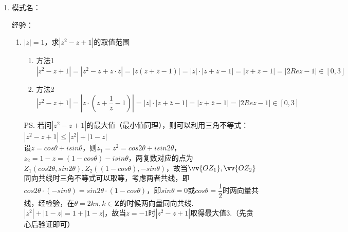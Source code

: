 \begin{enumerate}
\begin{enumerate}
\begin{jieda}
    \end{jieda}
    \end{enumerate}

    \item 模式名：
    
    经验：


    \begin{enumerate}
        \item $|z| = 1$，求$|z^2-z+1|$的取值范围
        \begin{jieda}
            \begin{enumerate}
                \item 方法1 \\
                $|z^2-z+1| = |z^2-z+z\cdot \overline{z}| = |z(z + \overline{z} - 1)| = |z| \cdot |z + \overline{z}-1| = |z + \overline{z}-1| = |2Re z - 1| \in [0, 3]$
                \item 方法2 \\
                $|z^2-z+1| = \left|z \cdot \left(z+\dfrac{1}{z} - 1\right)\right| = |z| \cdot |z + \overline{z}-1| = |z + \overline{z}-1| = |2Re z - 1| \in [0, 3]$
            \end{enumerate}
            \ps 若问$|z^2-z+1|$的最大值（最小值同理），则可以利用三角不等式：\\
            $|z^2-z+1| \leq |z^2| + |1-z|$ \\
            设$z = cos\theta + isin\theta$，则$z_1 = z^2 = cos2\theta + i sin2\theta$，$z_2 = 1-z = (1-cos\theta)-isin\theta$，两复数对应的点为$Z_1(cos2\theta, sin2\theta), Z_2((1-cos\theta), -sin\theta)$，故当$\vv{OZ_1}, \vv{OZ_2}$同向共线时三角不等式可以取等，考虑两者共线，即$cos2\theta \cdot (-sin\theta) = sin2\theta \cdot(1-cos\theta)$，即$sin\theta = 0$或$cos\theta = \dfrac{1}{2}$时两向量共线，经检验，在$\theta = 2k\pi, k \in \mathbf{Z}$的时候两向量同向共线. \\
            $|z^2| + |1-z| = 1 + |1-z|$，故当$z = -1$时$|z^2-z+1|$取得最大值3.（先贪心后验证即可）
        \end{jieda}
            

\end{enumerate}
\end{enumerate}
